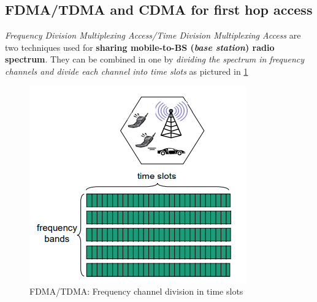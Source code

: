 \documentclass[10pt,a4paper]{report}
\theoremstyle{definition}
\begin{document}
\subsection{FDMA/TDMA and CDMA for first hop access}\label{sec:fdmatdma}
\textit{Frequency Division Multiplexing Access/Time Division Multiplexing Access} are two techniques used for \textbf{sharing mobile-to-BS (\textit{base station}) radio spectrum}.
They can be combined in one by \textit{dividing the spectrum in frequency channels and divide each channel into time slots} as pictured in \ref{fdma-slots}
\begin{figure}[h!]
	\centering\includegraphics[scale=0.50]{images/Pasted image 20230301173537.png}
	\caption{FDMA/TDMA: Frequency channel division in time slots}
	\label{fdma-slots}
\end{figure}
\end{document}
